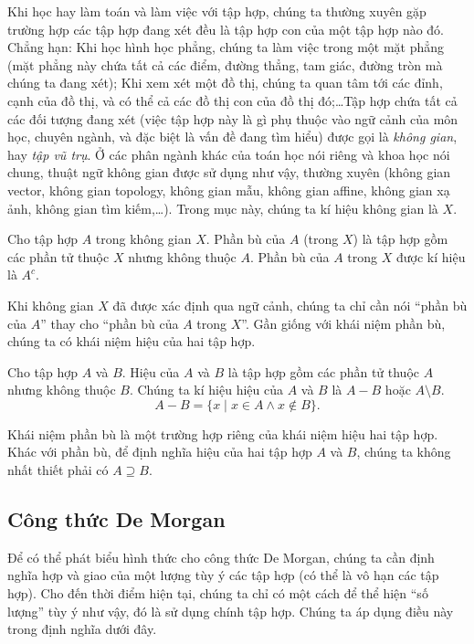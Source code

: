 Khi học hay làm toán và làm việc với tập hợp, chúng ta thường xuyên gặp trường hợp các tập hợp đang xét đều là tập hợp con của một tập hợp nào đó. Chẳng hạn: Khi học hình học phẳng, chúng ta làm việc trong một mặt phẳng (mặt phẳng này chứa tất cả các điểm, đường thẳng, tam giác, đường tròn mà chúng ta đang xét); Khi xem xét một đồ thị, chúng ta quan tâm tới các đỉnh, cạnh của đồ thị, và có thể cả các đồ thị con của đồ thị đó;\ldots Tập hợp chứa tất cả các đối tượng đang xét (việc tập hợp này là gì phụ thuộc vào ngữ cảnh của môn học, chuyên ngành, và đặc biệt là vấn đề đang tìm hiểu) được gọi là \textit{không gian}, hay \textit{tập vũ trụ}. Ở các phân ngành khác của toán học nói riêng và khoa học nói chung, thuật ngữ không gian được sử dụng như vậy, thường xuyên (không gian vector, không gian topology, không gian mẫu, không gian affine, không gian xạ ảnh, không gian tìm kiếm,\ldots). Trong mục này, chúng ta kí hiệu không gian là $X$.

\begin{definition}[Phần bù]
    Cho tập hợp $A$ trong không gian $X$. Phần bù của $A$ (trong $X$) là tập hợp gồm các phần tử thuộc $X$ nhưng không thuộc $A$. Phần bù của $A$ trong $X$ được kí hiệu là $A^{c}$.
\end{definition}

Khi không gian $X$ đã được xác định qua ngữ cảnh, chúng ta chỉ cần nói ``phần bù của $A$'' thay cho ``phần bù của $A$ trong $X$''. Gần giống với khái niệm phần bù, chúng ta có khái niệm hiệu của hai tập hợp.

\begin{definition}
    Cho tập hợp $A$ và $B$. Hiệu của $A$ và $B$ là tập hợp gồm các phần tử thuộc $A$ nhưng không thuộc $B$. Chúng ta kí hiệu hiệu của $A$ và $B$ là $A - B$ hoặc $A\setminus B$.
    \[
        A - B = \{ x \mid x\in A \wedge x\notin B \}.
    \]
\end{definition}

Khái niệm phần bù là một trường hợp riêng của khái niệm hiệu hai tập hợp. Khác với phần bù, để định nghĩa hiệu của hai tập hợp $A$ và $B$, chúng ta không nhất thiết phải có $A\supseteq B$.

\subsection{Công thức De Morgan}

Để có thể phát biểu hình thức cho công thức De Morgan, chúng ta cần định nghĩa hợp và giao của một lượng tùy ý các tập hợp (có thể là vô hạn các tập hợp). Cho đến thời điểm hiện tại, chúng ta chỉ có một cách để thể hiện ``số lượng'' tùy ý như vậy, đó là sử dụng chính tập hợp. Chúng ta áp dụng điều này trong định nghĩa dưới đây.

